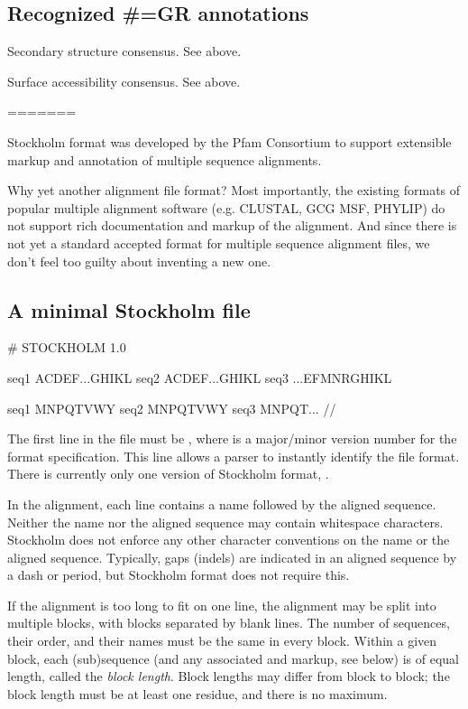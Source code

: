 \subsection{Recognized \#=GR annotations}

\begin{sreitems}{}
\item [\emcode{SS}]
	Secondary structure consensus. See  above.
\item [\emcode{SA}]
	Surface accessibility consensus. See  above.
\end{sreitems}


=======

Stockholm format was developed by the Pfam Consortium to support
extensible markup and annotation of multiple sequence alignments.

Why yet another alignment file format?  Most importantly, the existing
formats of popular multiple alignment software (e.g. CLUSTAL, GCG MSF,
PHYLIP) do not support rich documentation and markup of the
alignment. And since there is not yet a standard accepted format for
multiple sequence alignment files, we don't feel too guilty about
inventing a new one.

\subsection{A minimal Stockholm file}
\begin{cchunk}
# STOCKHOLM 1.0

seq1  ACDEF...GHIKL
seq2  ACDEF...GHIKL
seq3  ...EFMNRGHIKL

seq1  MNPQTVWY
seq2  MNPQTVWY
seq3  MNPQT...
//
\end{cchunk}

The first line in the file must be , where
 is a major/minor version number for the format
specification. This line allows a parser to instantly identify the
file format. There is currently only one version of Stockholm format,
.

In the alignment, each line contains a name followed by the aligned
sequence. Neither the name nor the aligned sequence may contain
whitespace characters. Stockholm does not enforce any other character
conventions on the name or the aligned sequence. Typically, gaps
(indels) are indicated in an aligned sequence by a dash or period, but
Stockholm format does not require this.

If the alignment is too long to fit on one line, the alignment may be
split into multiple blocks, with blocks separated by blank lines. The
number of sequences, their order, and their names must be the same in
every block. Within a given block, each (sub)sequence (and any
associated  and  markup, see below) is of
equal length, called the \emph{block length}. Block lengths may differ
from block to block; the block length must be at least one residue,
and there is no maximum.

